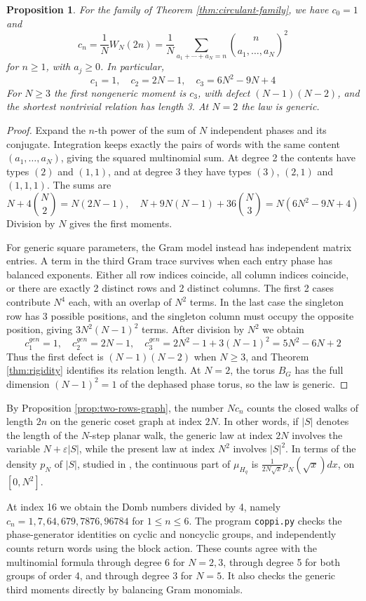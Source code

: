 \documentclass[11pt,reqno]{amsart}
\newtheorem{prop}[thm]{Proposition}
\theoremstyle{definition}
\numberwithin{equation}{section}
\begin{document}
\begin{prop}\label{prop:circulant-moments}
For the family of Theorem \ref{thm:circulant-family}, we have $c_0=1$ and
$$c_n=\frac1NW_N(2n)=\frac1N\sum_{a_1+\cdots+a_N=n}\binom n{a_1,\ldots,a_N}^2$$
for $n\geq1$, with $a_j\geq0$. In particular,
$$c_1=1,\quad c_2=2N-1,\quad c_3=6N^2-9N+4$$
For $N\geq3$ the first nongeneric moment is $c_3$, with defect $(N-1)(N-2)$, and the shortest nontrivial relation has length 3. At $N=2$ the law is generic.
\end{prop}
\begin{proof}
Expand the $n$-th power of the sum of $N$ independent phases and its conjugate. Integration keeps exactly the pairs of words with the same content $(a_1,\ldots,a_N)$, giving the squared multinomial sum. At degree 2 the contents have types $(2)$ and $(1,1)$, and at degree 3 they have types $(3)$, $(2,1)$ and $(1,1,1)$. The sums are
$$N+4\binom N2=N(2N-1),\quad N+9N(N-1)+36\binom N3=N(6N^2-9N+4)$$
Division by $N$ gives the first moments.

For generic square parameters, the Gram model instead has independent matrix entries. A term in the third Gram trace survives when each entry phase has balanced exponents. Either all row indices coincide, all column indices coincide, or there are exactly 2 distinct rows and 2 distinct columns. The first 2 cases contribute $N^4$ each, with an overlap of $N^2$ terms. In the last case the singleton row has 3 possible positions, and the singleton column must occupy the opposite position, giving $3N^2(N-1)^2$ terms. After division by $N^2$ we obtain
$$c_1^{gen}=1,\quad c_2^{gen}=2N-1,\quad c_3^{gen}=2N^2-1+3(N-1)^2=5N^2-6N+2$$
Thus the first defect is $(N-1)(N-2)$ when $N\geq3$, and Theorem \ref{thm:rigidity} identifies its relation length. At $N=2$, the torus $B_G$ has the full dimension $(N-1)^2=1$ of the dephased phase torus, so the law is generic.
\end{proof}

By Proposition \ref{prop:two-rows-graph}, the number $Nc_n$ counts the closed walks of length $2n$ on the generic coset graph at index $2N$. In other words, if $|S|$ denotes the length of the $N$-step planar walk, the generic law at index $2N$ involves the variable $N+\varepsilon|S|$, while the present law at index $N^2$ involves $|S|^2$. In terms of the density $p_N$ of $|S|$, studied in \cite{BSWZ12}, the continuous part of $\mu_{H_q}$ is $\frac1{2N\sqrt x}p_N(\sqrt x)dx$, on $[0,N^2]$.

At index 16 we obtain the Domb numbers divided by 4, namely $c_n=1,7,64,679,7876,96784$ for $1\leq n\leq6$. The program \texttt{coppi.py} checks the phase-generator identities on cyclic and noncyclic groups, and independently counts return words using the block action. These counts agree with the multinomial formula through degree 6 for $N=2,3$, through degree 5 for both groups of order 4, and through degree 3 for $N=5$. It also checks the generic third moments directly by balancing Gram monomials.
\end{document}
